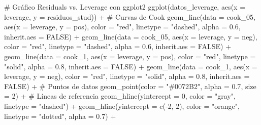 \documentclass[
  letterpaper,
  DIV=11,
  numbers=noendperiod]{scrreprt}
\newenvironment{Shaded}{\begin{snugshade}}{\end{snugshade}}
\newcommand{\AttributeTok}[1]{\textcolor[rgb]{0.40,0.45,0.13}{#1}}
\newcommand{\CommentTok}[1]{\textcolor[rgb]{0.37,0.37,0.37}{#1}}
\newcommand{\ConstantTok}[1]{\textcolor[rgb]{0.56,0.35,0.01}{#1}}
\newcommand{\DecValTok}[1]{\textcolor[rgb]{0.68,0.00,0.00}{#1}}
\newcommand{\FloatTok}[1]{\textcolor[rgb]{0.68,0.00,0.00}{#1}}
\newcommand{\FunctionTok}[1]{\textcolor[rgb]{0.28,0.35,0.67}{#1}}
\newcommand{\NormalTok}[1]{\textcolor[rgb]{0.00,0.23,0.31}{#1}}
\newcommand{\SpecialCharTok}[1]{\textcolor[rgb]{0.37,0.37,0.37}{#1}}
\newcommand{\StringTok}[1]{\textcolor[rgb]{0.13,0.47,0.30}{#1}}
\begin{document}
\begin{tcolorbox}
\begin{Shaded}
\begin{Highlighting}[]
\CommentTok{\# Gráfico Residuals vs. Leverage con ggplot2}
\FunctionTok{ggplot}\NormalTok{(datos\_leverage, }\FunctionTok{aes}\NormalTok{(}\AttributeTok{x =}\NormalTok{ leverage, }\AttributeTok{y =}\NormalTok{ residuos\_stud)) }\SpecialCharTok{+}
  \CommentTok{\# Curvas de Cook}
  \FunctionTok{geom\_line}\NormalTok{(}\AttributeTok{data =}\NormalTok{ cook\_05, }\FunctionTok{aes}\NormalTok{(}\AttributeTok{x =}\NormalTok{ leverage, }\AttributeTok{y =}\NormalTok{ pos), }
            \AttributeTok{color =} \StringTok{"red"}\NormalTok{, }\AttributeTok{linetype =} \StringTok{"dashed"}\NormalTok{, }\AttributeTok{alpha =} \FloatTok{0.6}\NormalTok{, }\AttributeTok{inherit.aes =} \ConstantTok{FALSE}\NormalTok{) }\SpecialCharTok{+}
  \FunctionTok{geom\_line}\NormalTok{(}\AttributeTok{data =}\NormalTok{ cook\_05, }\FunctionTok{aes}\NormalTok{(}\AttributeTok{x =}\NormalTok{ leverage, }\AttributeTok{y =}\NormalTok{ neg), }
            \AttributeTok{color =} \StringTok{"red"}\NormalTok{, }\AttributeTok{linetype =} \StringTok{"dashed"}\NormalTok{, }\AttributeTok{alpha =} \FloatTok{0.6}\NormalTok{, }\AttributeTok{inherit.aes =} \ConstantTok{FALSE}\NormalTok{) }\SpecialCharTok{+}
  \FunctionTok{geom\_line}\NormalTok{(}\AttributeTok{data =}\NormalTok{ cook\_1, }\FunctionTok{aes}\NormalTok{(}\AttributeTok{x =}\NormalTok{ leverage, }\AttributeTok{y =}\NormalTok{ pos), }
            \AttributeTok{color =} \StringTok{"red"}\NormalTok{, }\AttributeTok{linetype =} \StringTok{"solid"}\NormalTok{, }\AttributeTok{alpha =} \FloatTok{0.8}\NormalTok{, }\AttributeTok{inherit.aes =} \ConstantTok{FALSE}\NormalTok{) }\SpecialCharTok{+}
  \FunctionTok{geom\_line}\NormalTok{(}\AttributeTok{data =}\NormalTok{ cook\_1, }\FunctionTok{aes}\NormalTok{(}\AttributeTok{x =}\NormalTok{ leverage, }\AttributeTok{y =}\NormalTok{ neg), }
            \AttributeTok{color =} \StringTok{"red"}\NormalTok{, }\AttributeTok{linetype =} \StringTok{"solid"}\NormalTok{, }\AttributeTok{alpha =} \FloatTok{0.8}\NormalTok{, }\AttributeTok{inherit.aes =} \ConstantTok{FALSE}\NormalTok{) }\SpecialCharTok{+}
  \CommentTok{\# Puntos de datos}
  \FunctionTok{geom\_point}\NormalTok{(}\AttributeTok{color =} \StringTok{"\#0072B2"}\NormalTok{, }\AttributeTok{alpha =} \FloatTok{0.7}\NormalTok{, }\AttributeTok{size =} \DecValTok{2}\NormalTok{) }\SpecialCharTok{+}
  \CommentTok{\# Líneas de referencia}
  \FunctionTok{geom\_hline}\NormalTok{(}\AttributeTok{yintercept =} \DecValTok{0}\NormalTok{, }\AttributeTok{color =} \StringTok{"gray"}\NormalTok{, }\AttributeTok{linetype =} \StringTok{"dashed"}\NormalTok{) }\SpecialCharTok{+}
  \FunctionTok{geom\_hline}\NormalTok{(}\AttributeTok{yintercept =} \FunctionTok{c}\NormalTok{(}\SpecialCharTok{{-}}\DecValTok{2}\NormalTok{, }\DecValTok{2}\NormalTok{), }\AttributeTok{color =} \StringTok{"orange"}\NormalTok{, }\AttributeTok{linetype =} \StringTok{"dotted"}\NormalTok{, }\AttributeTok{alpha =} \FloatTok{0.7}\NormalTok{) }\SpecialCharTok{+}

\end{Highlighting}
\end{Shaded}
\end{tcolorbox}
\end{document}
